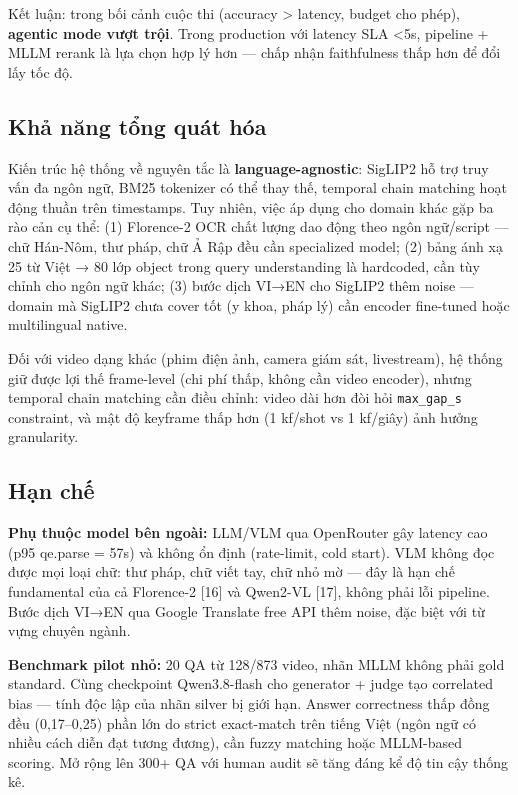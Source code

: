 \documentclass[12pt,a4paper,onecolumn]{article}
\begin{document}
Kết luận: trong bối cảnh cuộc thi (accuracy > latency, budget cho phép), \textbf{agentic mode vượt trội}. Trong production với latency SLA <5s, pipeline + MLLM rerank là lựa chọn hợp lý hơn — chấp nhận faithfulness thấp hơn để đổi lấy tốc độ.

\subsection{Khả năng tổng quát hóa}

Kiến trúc hệ thống về nguyên tắc là \textbf{language-agnostic}: SigLIP2 hỗ trợ truy vấn đa ngôn ngữ, BM25 tokenizer có thể thay thế, temporal chain matching hoạt động thuần trên timestamps. Tuy nhiên, việc áp dụng cho domain khác gặp ba rào cản cụ thể: (1) Florence-2 OCR chất lượng dao động theo ngôn ngữ/script — chữ Hán-Nôm, thư pháp, chữ Ả Rập đều cần specialized model; (2) bảng ánh xạ 25 từ Việt → 80 lớp object trong query understanding là hardcoded, cần tùy chỉnh cho ngôn ngữ khác; (3) bước dịch VI→EN cho SigLIP2 thêm noise — domain mà SigLIP2 chưa cover tốt (y khoa, pháp lý) cần encoder fine-tuned hoặc multilingual native.

Đối với video dạng khác (phim điện ảnh, camera giám sát, livestream), hệ thống giữ được lợi thế frame-level (chi phí thấp, không cần video encoder), nhưng temporal chain matching cần điều chỉnh: video dài hơn đòi hỏi \texttt{max\_gap\_s} constraint, và mật độ keyframe thấp hơn (1 kf/shot vs 1 kf/giây) ảnh hưởng granularity.

\subsection{Hạn chế}

\textbf{Phụ thuộc model bên ngoài:} LLM/VLM qua OpenRouter gây latency cao (p95 qe.parse = 57s) và không ổn định (rate-limit, cold start). VLM không đọc được mọi loại chữ: thư pháp, chữ viết tay, chữ nhỏ mờ — đây là hạn chế fundamental của cả Florence-2 [16] và Qwen2-VL [17], không phải lỗi pipeline. Bước dịch VI→EN qua Google Translate free API thêm noise, đặc biệt với từ vựng chuyên ngành.

\textbf{Benchmark pilot nhỏ:} 20 QA từ 128/873 video, nhãn MLLM không phải gold standard. Cùng checkpoint Qwen3.8-flash cho generator + judge tạo correlated bias — tính độc lập của nhãn silver bị giới hạn. Answer correctness thấp đồng đều (0,17–0,25) phần lớn do strict exact-match trên tiếng Việt (ngôn ngữ có nhiều cách diễn đạt tương đương), cần fuzzy matching hoặc MLLM-based scoring. Mở rộng lên 300+ QA với human audit sẽ tăng đáng kể độ tin cậy thống kê.
\end{document}
